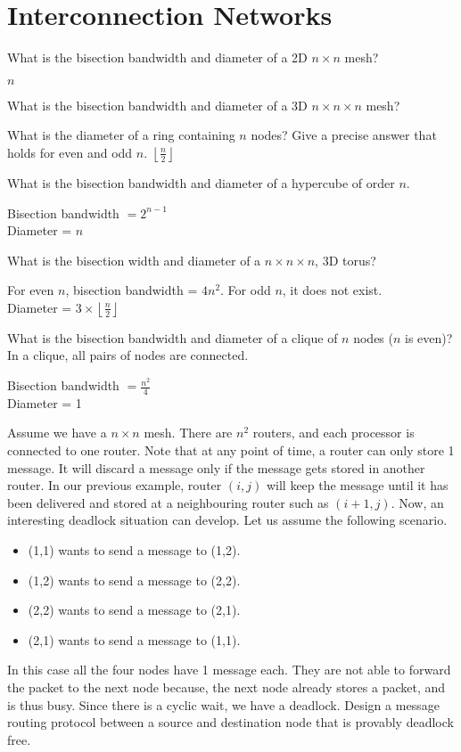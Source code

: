\section*{Interconnection Networks}
\begin{ExerciseList}

\Exercise
What is the bisection bandwidth and diameter of a 2D $n\times n$ mesh?

\Answer
$n$

\Exercise
What is the bisection bandwidth and diameter of a 3D $n\times n \times n$ mesh?

\Exercise
What is the diameter of a ring containing $n$ nodes? Give a precise answer that holds for even and
odd $n$.
\Answer
$\left \lfloor \frac{n}{2} \right \rfloor$


\Exercise
What is the bisection bandwidth and diameter of a hypercube of order $n$.

\Answer
Bisection bandwidth $ = 2^{n-1}$\\
Diameter = $n$


\Exercise
What is the bisection width and diameter of a $n \times n \times n$,
3D torus? 

\Answer
For even $n$, bisection bandwidth = $4n^2$. For odd $n$, it does not exist.\\
Diameter = $3\times \left \lfloor \frac{n}{2} \right \rfloor$


\Exercise
What is the bisection bandwidth and diameter of a clique of $n$ nodes ($n$ is even)?
In a clique, all pairs of nodes are connected.

\Answer
Bisection bandwidth $= \frac{n^2}{4}$\\
Diameter = 1

\Exercise[difficulty=2]
Assume we have a $n\times n$ mesh. There are $n^2$ routers, 
and each processor is connected to one router. 
Note that at any point of time, a router can only store 1 message. It will discard a message only if
the message gets stored in another router. In our previous example, router $(i,j)$ will keep the message until
it has been delivered and stored at a neighbouring router such as $(i+1,j)$.  
Now, an interesting deadlock situation can develop. Let us assume the following scenario. 

\begin{itemize}
\item (1,1) wants to send a message to (1,2).
\item (1,2) wants to send a message to (2,2).
\item (2,2) wants to send a message to (2,1).
\item (2,1) wants to send a message to (1,1).
\end{itemize}

In this case all the four nodes have 1 message each. They are not able to forward the packet to the next node
because, the next node already stores a packet, and is thus busy. Since there is a cyclic wait, we have a deadlock.
Design a message routing protocol between a source and destination node that is provably deadlock free.
\end{ExerciseList}


